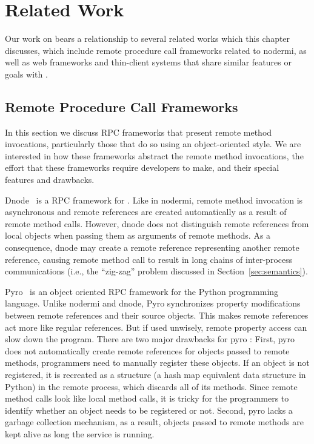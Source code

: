 \chapter{Related Work}

Our work on \cb bears a relationship to several related works
which this chapter discusses, which include remote procedure call frameworks 
related to nodermi, as well as web frameworks and thin-client systems
that share similar features or goals with \cb.

\section{Remote Procedure Call Frameworks}
\label{sec:relatedrpc}

In this section we discuss RPC frameworks that present remote method
invocations, particularly those that do so using an object-oriented style.  
We are interested in how these
frameworks abstract the remote method invocations, the effort that these
frameworks require developers to make, and their special features and
drawbacks.

Dnode~\cite{dnode} is a RPC framework for \nodejs{}.  Like in nodermi, remote
method invocation is asynchronous and remote references are created automatically
as a result of remote method calls. However, dnode does not distinguish remote
references from local objects when passing them as arguments of remote
methods. As a consequence, dnode may create a remote reference representing
another remote reference,  causing  remote method call to result in long chains
of inter-process communications (i.e., the ``zig-zag'' problem discussed in
Section~\ref{sec:semantics}). 



 
Pyro~\cite{pyro} is an object oriented RPC framework for the Python programming
language. Unlike nodermi and dnode, Pyro synchronizes  property modifications
between remote references and their source objects. This makes remote
references act more like regular references.  But if used unwisely, remote
property access can slow down the program. There are two major drawbacks for
pyro : First, pyro does not automatically create remote references for objects
passed to remote methods, programmers need to manually register these objects.
If an object is not registered, it is recreated as a  structure (a
hash map equivalent data structure in Python) in the remote process, which discards
all of its methods. Since remote method calls look like local method calls, it is
tricky for the programmers to identify whether an object needs to be
registered or not.  Second, pyro lacks a garbage collection mechanism, 
as a result, objects passed to remote methods are kept alive as long the 
service is running.

